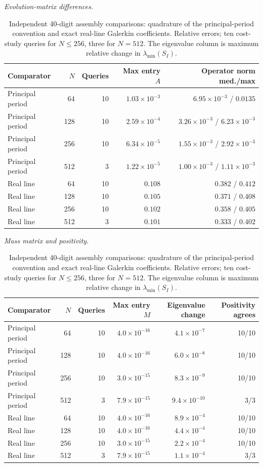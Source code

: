 \begin{table}[!htbp]
\centering\small
\caption{Independent 40-digit assembly comparisons: quadrature of the
principal-period convention and exact real-line Galerkin coefficients.
Relative errors; ten cost-study queries for $N\le256$, three for $N=512$.
The eigenvalue column is maximum relative change in $\lambda_{\min}(S_I)$.}
\label{tab:assembly}
\textit{Evolution-matrix differences.}\par\smallskip
\begin{tabular}{lrrrr}
\toprule
Comparator & $N$ & Queries & Max entry $A$ & Operator norm med./max\\
\midrule
Principal period & 64 & 10 & $1.03\times10^{-3}$ & $6.95\times10^{-3}$ / $0.0135$\\
Principal period & 128 & 10 & $2.59\times10^{-4}$ & $3.26\times10^{-3}$ / $6.23\times10^{-3}$\\
Principal period & 256 & 10 & $6.34\times10^{-5}$ & $1.55\times10^{-3}$ / $2.92\times10^{-3}$\\
Principal period & 512 & 3 & $1.22\times10^{-5}$ & $1.00\times10^{-3}$ / $1.11\times10^{-3}$\\
Real line & 64 & 10 & $0.108$ & $0.382$ / $0.412$\\
Real line & 128 & 10 & $0.105$ & $0.371$ / $0.408$\\
Real line & 256 & 10 & $0.102$ & $0.358$ / $0.405$\\
Real line & 512 & 3 & $0.101$ & $0.333$ / $0.402$\\
\bottomrule
\end{tabular}
\par\smallskip\textit{Mass matrix and positivity.}\par\smallskip
\begin{tabular}{lrrrrr}
\toprule
Comparator & $N$ & Queries & Max entry $M$ & Eigenvalue change & Positivity agrees\\
\midrule
Principal period & 64 & 10 & $4.0\times10^{-16}$ & $4.1\times10^{-7}$ & 10/10\\
Principal period & 128 & 10 & $4.0\times10^{-16}$ & $6.0\times10^{-8}$ & 10/10\\
Principal period & 256 & 10 & $3.0\times10^{-15}$ & $8.3\times10^{-9}$ & 10/10\\
Principal period & 512 & 3 & $7.9\times10^{-15}$ & $9.4\times10^{-10}$ & 3/3\\
Real line & 64 & 10 & $4.0\times10^{-16}$ & $8.9\times10^{-4}$ & 10/10\\
Real line & 128 & 10 & $4.0\times10^{-16}$ & $4.4\times10^{-4}$ & 10/10\\
Real line & 256 & 10 & $3.0\times10^{-15}$ & $2.2\times10^{-4}$ & 10/10\\
Real line & 512 & 3 & $7.9\times10^{-15}$ & $1.1\times10^{-4}$ & 3/3\\
\bottomrule
\end{tabular}
\end{table}
